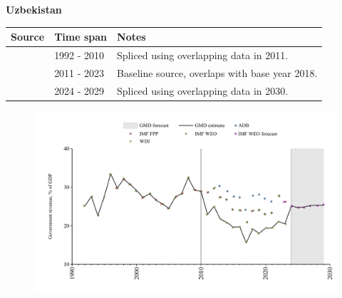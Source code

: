 \documentclass[12pt,a4paper,landscape]{article}
\begin{document}
\begin{adjustbox}{max totalsize={\paperwidth}{\paperheight},center}
\begin{minipage}[t][\textheight][t]{\textwidth}
\vspace*{0.5cm}
{}
\begin{center}
{\Large\bfseries Uzbekistan}
\end{center}
\vspace{0.5cm}
\begin{table}[H]
\centering
\small
\begin{tabular}{|l|l|l|}
\hline
\textbf{Source} & \textbf{Time span} & \textbf{Notes} \\
\hline
\rowcolor{white}\cite{IMF_WEO}& 1992 - 2010 &Spliced using overlapping data in 2011.\\
\rowcolor{lightgray}\cite{WDI}& 2011 - 2023 &Baseline source, overlaps with base year 2018.\\
\rowcolor{white}\cite{IMF_WEO_forecast}& 2024 - 2029 &Spliced using overlapping data in 2030.\\
\hline
\end{tabular}
\end{table}
\begin{figure}[H]
\centering
\includegraphics[width=\textwidth,height=0.6\textheight,keepaspectratio]{graphs/UZB_govrev_GDP.pdf}
\end{figure}
\end{minipage}
\end{adjustbox}
\end{document}
